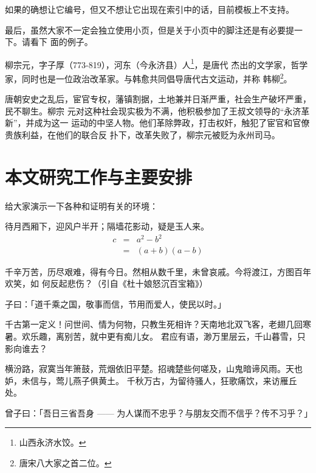 如果的确想让它编号，但又不想让它出现在索引中的话，目前模板上不支持。

最后，虽然大家不一定会独立使用小页，但是关于小页中的脚注还是有必要提一下。请看下
面的例子。

\begin{minipage}[t]{\linewidth-2\parindent}
  柳宗元，字子厚（773-819），河东（今永济县）人\footnote{山西永济水饺。}，是唐代
  杰出的文学家，哲学家，同时也是一位政治改革家。与韩愈共同倡导唐代古文运动，并称
  韩柳\footnote{唐宋八大家之首二位。}。
\end{minipage}

唐朝安史之乱后，宦官专权，藩镇割据，土地兼并日渐严重，社会生产破坏严重，民不聊生。柳宗
元对这种社会现实极为不满，他积极参加了王叔文领导的“永济革新”，并成为这一
运动的中坚人物。他们革除弊政，打击权奸，触犯了宦官和官僚贵族利益，在他们的联合反
扑下，改革失败了，柳宗元被贬为永州司马。

\section{本文研究工作与主要安排}
\label{sec:theorem}

给大家演示一下各种和证明有关的环境：

\begin{assumption}
待月西厢下，迎风户半开；隔墙花影动，疑是玉人来。
\begin{eqnarray}
  \label{eq:eqnxmp}
  c & = & a^2 - b^2\\
    & = & (a+b)(a-b)
\end{eqnarray}
\end{assumption}

千辛万苦，历尽艰难，得有今日。然相从数千里，未曾哀戚。今将渡江，方图百年欢笑，如
何反起悲伤？（引自《杜十娘怒沉百宝箱》）

\begin{definition}
子曰：「道千乘之国，敬事而信，节用而爱人，使民以时。」
\end{definition}

千古第一定义！问世间、情为何物，只教生死相许？天南地北双飞客，老翅几回寒暑。欢乐趣，离别苦，就中更有痴儿女。
君应有语，渺万里层云，千山暮雪，只影向谁去？

横汾路，寂寞当年箫鼓，荒烟依旧平楚。招魂楚些何嗟及，山鬼暗谛风雨。天也妒，未信与，莺儿燕子俱黄土。
千秋万古，为留待骚人，狂歌痛饮，来访雁丘处。

\begin{proposition}
 曾子曰：「吾日三省吾身 —— 为人谋而不忠乎？与朋友交而不信乎？传不习乎？」
\end{proposition}

